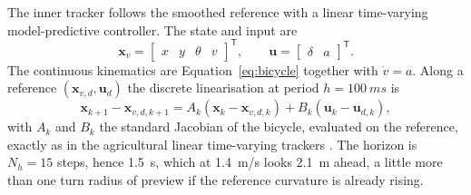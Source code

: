 The inner tracker follows the smoothed reference with a linear time-varying model-predictive controller. The state and input are
\begin{equation}
\label{eq:xu}
\mathbf{x}_v =
\begin{bmatrix} x & y & \theta & v \end{bmatrix}^{\mathsf{T}},\qquad
\mathbf{u} =
\begin{bmatrix} \delta & a \end{bmatrix}^{\mathsf{T}}.
\end{equation}
The continuous kinematics are Equation~\eqref{eq:bicycle} together with \(\dot{v}=a\). Along a reference \((\mathbf{x}_{v,d},\mathbf{u}_d)\) the discrete linearisation at period \(h=\SI{100}{ms}\) is
\begin{equation}
\label{eq:ltv}
\mathbf{x}_{k+1} - \mathbf{x}_{v,d,k+1} = A_k (\mathbf{x}_k-\mathbf{x}_{v,d,k}) + B_k (\mathbf{u}_k-\mathbf{u}_{d,k}),
\end{equation}
with \(A_k\) and \(B_k\) the standard Jacobian of the bicycle, evaluated on the reference, exactly as in the agricultural linear time-varying trackers \cite{plessen2017}. The horizon is \(N_h=15\) steps, hence \SI{1.5}{s}, which at \SI{1.4}{m/s} looks \SI{2.1}{m} ahead, a little more than one turn radius of preview if the reference curvature is already rising.

